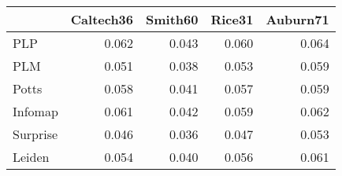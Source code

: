 \begin{tabular}{lrrrr}
\toprule
{} & Caltech36 & Smith60 & Rice31 & Auburn71 \\
\midrule
PLP      &     0.062 &   0.043 &  0.060 &    0.064 \\
PLM      &     0.051 &   0.038 &  0.053 &    0.059 \\
Potts    &     0.058 &   0.041 &  0.057 &    0.059 \\
Infomap  &     0.061 &   0.042 &  0.059 &    0.062 \\
Surprise &     0.046 &   0.036 &  0.047 &    0.053 \\
Leiden   &     0.054 &   0.040 &  0.056 &    0.061 \\
\bottomrule
\end{tabular}
